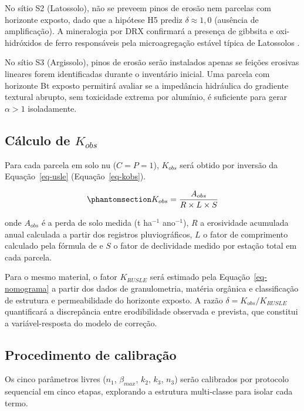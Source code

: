 \documentclass[
  brazilian,
  authoryear,
  preprint]{elsarticle}
\begin{document}
No sítio S2 (Latossolo), não se preveem pinos de erosão nem parcelas com
horizonte exposto, dado que a hipótese H5 prediz
\(\delta \approx 1{,}0\) (ausência de amplificação). A mineralogia por
DRX confirmará a presença de gibbsita e oxi-hidróxidos de ferro
responsáveis pela microagregação estável típica de Latossolos
\citep{silva_et_al_2009}.

No sítio S3 (Argissolo), pinos de erosão serão instalados apenas se
feições erosivas lineares forem identificadas durante o inventário
inicial. Uma parcela com horizonte Bt exposto permitirá avaliar se a
impedância hidráulica do gradiente textural abrupto, sem toxicidade
extrema por alumínio, é suficiente para gerar \(\alpha > 1\)
isoladamente.

\subsection{\texorpdfstring{Cálculo de
\(K_{obs}\)}{Cálculo de K\_\{obs\}}}\label{cuxe1lculo-de-k_obs}

Para cada parcela em solo nu (\(C = P = 1\)), \(K_{obs}\) será obtido
por inversão da Equação~\ref{eq-usle} (Equação~\ref{eq-kobs}).

\begin{equation}\phantomsection\label{eq-kobs}{
K_{obs} = \dfrac{A_{obs}}{R \times L \times S}
}\end{equation}

onde \(A_{obs}\) é a perda de solo medida (t ha\(^{-1}\) ano\(^{-1}\)),
\(R\) a erosividade acumulada anual calculada a partir dos registros
pluviográficos, \(L\) o fator de comprimento calculado pela fórmula de
\citet{renard_et_al_1997} e \(S\) o fator de declividade medido por
estação total em cada parcela.

Para o mesmo material, o fator \(K_{RUSLE}\) será estimado pela
Equação~\ref{eq-nomograma} a partir dos dados de granulometria, matéria
orgânica e classificação de estrutura e permeabilidade do horizonte
exposto. A razão \(\delta = K_{obs}/K_{RUSLE}\) quantificará a
discrepância entre erodibilidade observada e prevista, que constitui a
variável-resposta do modelo de correção.

\subsection{Procedimento de
calibração}\label{procedimento-de-calibrauxe7uxe3o}

Os cinco parâmetros livres (\(n_1\), \(\beta_{max}\), \(k_2\), \(k_3\),
\(n_3\)) serão calibrados por protocolo sequencial em cinco etapas,
explorando a estrutura multi-classe para isolar cada termo.
\end{document}
